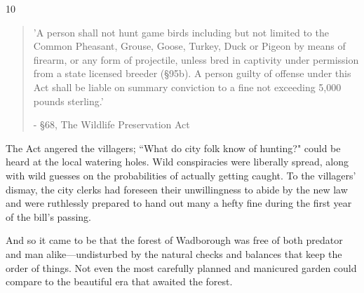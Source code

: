 \begin{localsize}{10}
	\begin{quote}
		'A person shall not hunt game birds including but not limited to the Common Pheasant, Grouse, Goose, Turkey, Duck or Pigeon by means of firearm, or any form of projectile, unless bred in captivity under permission from a state licensed breeder (§95b). A person guilty of offense under this Act shall be liable on summary conviction to a fine not exceeding 5,000 pounds sterling.'
		\begin{flushright}- §68, The Wildlife Preservation Act\end{flushright}
	\end{quote} 
\end{localsize}
 
The Act angered the villagers; ``What do city folk know of hunting?" could be heard at the local watering holes.
Wild conspiracies were liberally spread, along with wild guesses on the probabilities of actually getting caught.
To the villagers' dismay, the city clerks had foreseen their unwillingness to abide by the new law and were ruthlessly prepared to hand out many a hefty fine during the first year of the bill's passing.

And so it came to be that the forest of Wadborough was free of both predator and man alike---undisturbed by the natural checks and balances that keep the order of things.
Not even the most carefully planned and manicured garden could compare to the beautiful era that awaited the forest.


